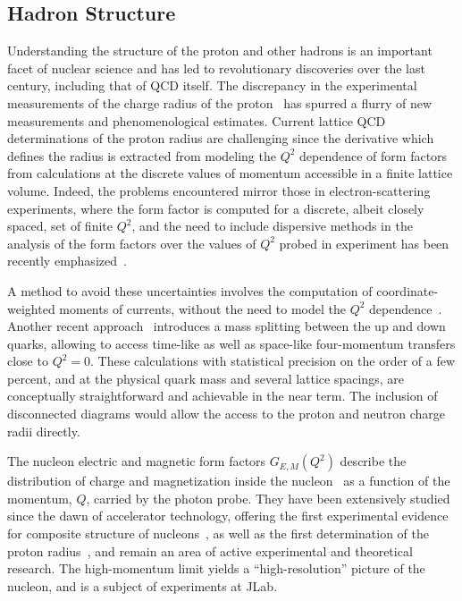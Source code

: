 
\subsection{Hadron Structure}

Understanding the structure of the proton and other hadrons is an important facet of  nuclear science and  has led to revolutionary discoveries over the last century, including that of QCD itself.  
The discrepancy in the experimental measurements of the charge radius of the proton~\cite{Antognini:1900ns} has spurred a flurry of new measurements and phenomenological estimates. Current lattice QCD determinations of the proton radius are challenging since the derivative which defines the radius is extracted from modeling the $Q^2$ dependence of form factors from calculations at the discrete values of momentum accessible in a finite lattice volume.  Indeed, the problems encountered mirror those in electron-scattering experiments, where the form factor is computed for a discrete, albeit closely spaced, set of finite $Q^2$, and the need to include dispersive methods in the analysis of the form factors over the values of $Q^2$ probed in experiment has been recently emphasized~\cite{Belushkin:2006qa,Hoferichter:2016duk,Alarcon:2018irp}.

A method to avoid these uncertainties involves the computation of coordinate-weighted moments of currents, without the need to model the $Q^2$ dependence~\cite{Bouchard:2016gmc}. Another recent approach~\cite{Detmold:2018ptb} introduces a mass splitting between the up and down quarks, allowing to access time-like as well as space-like four-momentum transfers close to $Q^2=0$. These calculations with statistical precision on the order of a few percent, and at the physical quark mass and several lattice spacings, are conceptually straightforward and achievable in the near term. The inclusion of disconnected diagrams would allow the access to the proton and neutron charge radii directly.

The nucleon electric and magnetic form factors $G_{E,M}(Q^2)$ describe the distribution of charge and
magnetization inside the
nucleon~\cite{Burkardt:2000za,Burkardt:2002hr,Miller:2007uy,Carlson:2007xd} as a function of the momentum, $Q$, carried by the photon probe.
They have been extensively studied since the dawn of
accelerator technology, offering the first experimental evidence for composite structure 
of nucleons~\cite{Hofstadter:1955ae}, as well as the first
determination of the proton radius~\cite{Chambers:1956zz},
and remain an area of active experimental and theoretical research. The high-momentum limit yields a ``high-resolution'' picture of the nucleon, and is a subject of experiments at JLab.

